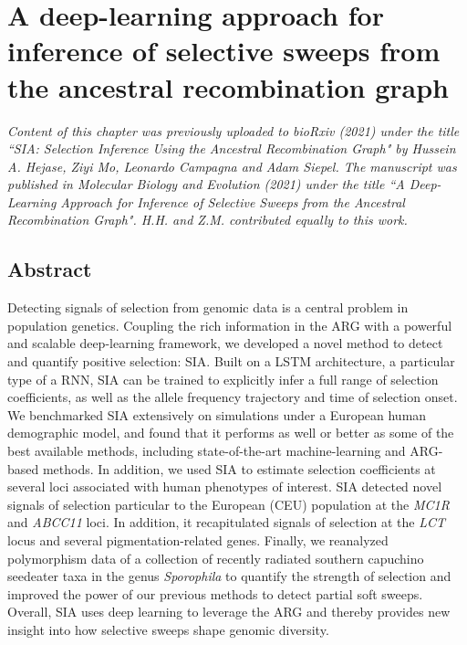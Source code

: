 \chapter{A deep-learning approach for inference of selective sweeps from the ancestral recombination graph} \label{chapter2}

\textit{Content of this chapter was previously uploaded to bioRxiv (2021) under the title ``SIA: Selection Inference Using the Ancestral Recombination Graph" by Hussein A. Hejase, Ziyi Mo, Leonardo Campagna and Adam Siepel. The manuscript was published in Molecular Biology and Evolution (2021) under the title ``A Deep-Learning Approach for Inference of Selective Sweeps from the Ancestral Recombination Graph". H.H. and Z.M. contributed equally to this work.}

\section{Abstract}

Detecting signals of selection from genomic data is a central problem in population genetics. Coupling the rich information in the \acf{ARG} with a powerful and scalable deep-learning framework, we developed a novel method to detect and quantify positive selection: \acf{SIA}. Built on a \ac{LSTM} architecture, a particular type of a \ac{RNN}, SIA can be trained to explicitly infer a full range of selection coefficients, as well as the allele frequency trajectory and time of selection onset. We benchmarked \ac{SIA} extensively on simulations under a European human demographic model, and found that it performs as well or better as some of the best available methods, including state-of-the-art machine-learning and \ac{ARG}-based methods. In addition, we used \ac{SIA} to estimate selection coefficients at several loci associated with human phenotypes of interest. \ac{SIA} detected novel signals of selection particular to the European (CEU) population at the \textit{MC1R} and \textit{ABCC11} loci. In addition, it recapitulated signals of selection at the \textit{LCT} locus and several pigmentation-related genes. Finally, we reanalyzed polymorphism data of a collection of recently radiated southern capuchino seedeater taxa in the genus \textit{Sporophila} to quantify the strength of selection and improved the power of our previous methods to detect partial soft sweeps. Overall, \ac{SIA} uses deep learning to leverage the \ac{ARG} and thereby provides new insight into how selective sweeps shape genomic diversity.

